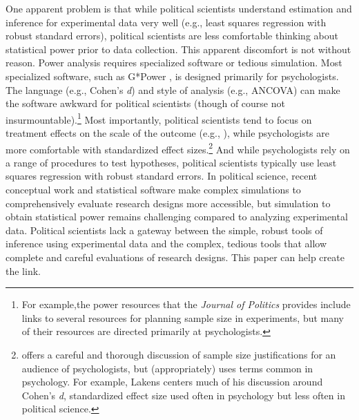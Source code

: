 \documentclass[12pt]{article}
\begin{document}
One apparent problem is that while political scientists understand estimation and inference for experimental data very well (e.g., least squares regression with robust standard errors), political scientists are less comfortable thinking about statistical power prior to data collection. 
This apparent discomfort is not without reason. 
Power analysis requires specialized software or tedious simulation. 
Most specialized software, such as G*Power \citep{Faul2007, Faul2009}, is designed primarily for psychologists. 
The language (e.g., Cohen's \emph{d}) and style of analysis (e.g., ANCOVA) can make the software awkward for political scientists (though of course not insurmountable).\footnote{
  For example,the power resources that the \emph{Journal of Politics} provides include links to several resources for planning sample size in experiments, but many of their resources are directed primarily at psychologists.
  }
Most importantly, political scientists tend to focus on treatment effects on the scale of the outcome (e.g., \citealt{King2000}), while psychologists are more comfortable with standardized effect sizes.\footnote{
  \cite{Lakens2022} offers a careful and thorough discussion of sample size justifications for an audience of psychologists, but (appropriately) uses terms common in psychology.
  For example, Lakens centers much of his discussion around Cohen's \emph{d}, standardized effect size used often in psychology but less often in political science.
  } 
And while psychologists rely on a range of procedures to test hypotheses, political scientists typically use least squares regression with robust standard errors.
In political science, recent conceptual work and statistical software \citep{Blair2019, Blair2023} make complex simulations to comprehensively evaluate research designs more accessible, but simulation to obtain statistical power remains challenging compared to analyzing experimental data.
Political scientists lack a gateway between the simple, robust tools of inference using experimental data and the complex, tedious tools that allow complete and careful evaluations of research designs.
This paper can help create the link.
\end{document}
